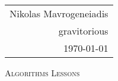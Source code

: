 \documentclass[12pt]{article}
\begin{document}
	\null\hfill\begin{tabular}[t]{r@{}}
		Nikolas Mavrogeneiadis \\
		gravitorious \\
		\today
	\end{tabular}
	\centerline{\scshape{Algorithms Lessons}}
	
\end{document}
